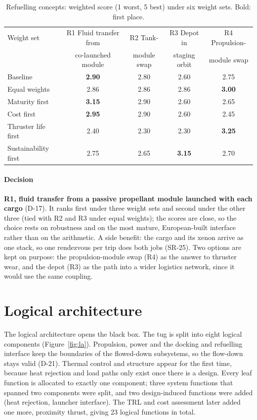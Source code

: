 \documentclass[11pt,a4paper]{article}
\newcommand{\id}[1]{#1}
\begin{document}
\begin{table}[htbp]\centering\small
\caption{Refuelling concepts: weighted score (1 worst, 5 best) under six weight sets. Bold: first place.}\label{tab:refuel}
\begin{tabularx}{\linewidth}{@{}Lcccc@{}}
\toprule
Weight set & R1 Fluid transfer from & R2 Tank- & R3 Depot in & R4 Propulsion- \\
 & co-launched module & module swap & staging orbit & module swap \\
\midrule
Baseline & \textbf{2.90} & 2.80 & 2.60 & 2.75 \\
Equal weights & 2.86 & 2.86 & 2.86 & \textbf{3.00} \\
Maturity first & \textbf{3.15} & 2.90 & 2.60 & 2.65 \\
Cost first & \textbf{2.95} & 2.90 & 2.60 & 2.45 \\
Thruster life first & 2.40 & 2.30 & 2.30 & \textbf{3.25} \\
Sustainability first & 2.75 & 2.65 & \textbf{3.15} & 2.70 \\
\bottomrule
\end{tabularx}
\end{table}

\paragraph{Decision} \textbf{R1, fluid transfer from a passive propellant module launched with each cargo} (\id{D-17}). It ranks first under three weight sets and second under the other three (tied with R2 and R3 under equal weights); the scores are close, so the choice rests on robustness and on the most mature, European-built interface rather than on the arithmetic. A side benefit: the cargo and its xenon arrive as one stack, so one rendezvous per trip does both jobs (\id{SR-25}). Two options are kept on purpose: the propulsion-module swap (R4) as the answer to thruster wear, and the depot (R3) as the path into a wider logistics network, since it would use the same coupling.

\section{Logical architecture}\label{sec:la}

The logical architecture opens the black box. The tug is split into eight logical components (Figure~\ref{fig:la}). Propulsion, power and the docking and refuelling interface keep the boundaries of the flowed-down subsystems, so the flow-down stays valid (\id{D-21}). Thermal control and structure appear for the first time, because heat rejection and load paths only exist once there is a design. Every leaf function is allocated to exactly one component; three system functions that spanned two components were split, and two design-induced functions were added (heat rejection, launcher interface). The TRL and cost assessment later added one more, proximity thrust, giving 23 logical functions in total.
\end{document}
